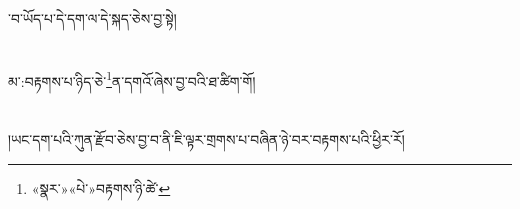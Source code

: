 ་བ་ཡོད་པ་དེ་དག་ལ་དེ་སྐད་ཅེས་བྱ་སྟེ།\chapter{ }མ་:བརྟགས་པ་ཉིད་ཅེ་\footnote{«སྣར་»«པེ་»བརྟགས་ཉི་ཚེ་}ན་དགའོ་ཞེས་བྱ་བའི་ཐ་ཚིག་གོ།\chapter{ }།ཡང་དག་པའི་ཀུན་རྫོབ་ཅེས་བྱ་བ་ནི་ཇི་ལྟར་གྲགས་པ་བཞིན་ཉེ་བར་བརྟགས་པའི་ཕྱིར་རོ།\chap